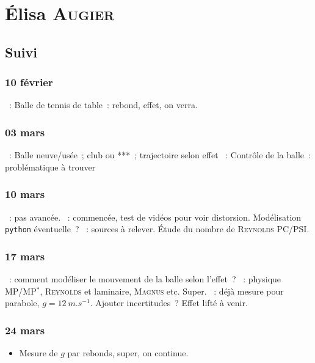 \documentclass[a4paper, 11pt, final, garamond]{book}
\begin{document}
\chapter{Élisa \textsc{Augier}}
\label{ch:elisa}
\section{Suivi}
\subsection{10 février}
\begin{itemize}
    ~: Balle de tennis de table~: rebond, effet, on verra.
\end{itemize}

\subsection{03 mars}
\begin{itemize}
    ~: Balle neuve/usée~; club ou ***~; trajectoire selon effet
    ~: Contrôle de la balle~: problématique à trouver
\end{itemize}

\subsection{10 mars}
\begin{itemize}
    ~: pas avancée.
    ~: commencée, test de vidéos pour voir distorsion. Modélisation
        \texttt{python} éventuelle~?
    ~: sources à relever. Étude du nombre de \textsc{Reynolds}
        PC/PSI.
\end{itemize}

\subsection{17 mars}
\begin{itemize}
    ~: comment modéliser le mouvement de la balle selon l'effet~?
    ~: physique MP/MP$^*$, \textsc{Reynolds} et laminaire,
        \textsc{Magnus} etc. Super.
    ~: déjà mesure pour parabole, $g = \SI{12}{m.s^{-1}}$. Ajouter
        incertitudes~? Effet lifté à venir.
\end{itemize}

\subsection{24 mars}
\begin{itemize}
    \item Mesure de $g$ par rebonds, super, on continue.
\end{itemize}
\end{document}
